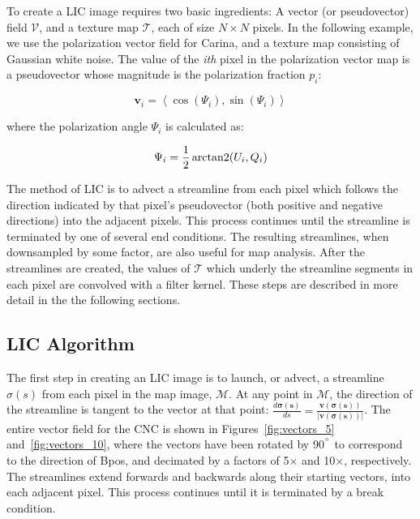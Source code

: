 To create a LIC image requires two basic ingredients: A vector (or pseudovector) field $\boldsymbol{\mathcal{V}}$, and a texture map $\mathcal{T}$, each of size $N \times N$ pixels. In the following example, we use the polarization vector field for Carina, and a texture map consisting of Gaussian white noise. The value of the \textit{ith} pixel in the polarization vector map is a pseudovector whose magnitude is the polarization fraction $p_{i}$:

\begin{equation}\label{eq:pol vector}
  \boldsymbol{v}_{i} = \left< \mathrm{\cos}(\Psi_{i}), \mathrm{\sin}(
  \Psi_{i}) \right>
\end{equation}

where the polarization angle $\Psi_{i}$ is calculated as:

\begin{equation}\label{eq:pol angle 2}
  \Psi_{i} = \frac{1}{2}\operatorname{arctan2}(U_{i}, Q_{i})
\end{equation}

The method of LIC is to advect a streamline from each pixel which follows the direction indicated by that pixel's pseudovector (both positive and negative directions) into the adjacent pixels. This process continues until the streamline is terminated by one of several end conditions. The resulting streamlines, when downsampled by some factor, are also useful for map analysis. After the streamlines are created, the values of $\mathcal{T}$ which underly the streamline segments in each pixel are convolved with a filter kernel. These steps are described in more detail in the the following sections.

\subsection{LIC Algorithm}

The first step in creating an LIC image is to launch, or advect, a streamline $\sigma(s)$ from each pixel in the map image, $\mathcal{M}$. At any point in $\mathcal{M}$, the direction of the streamline is tangent to the vector at that point: $\frac{ d\boldsymbol{\sigma(s)}}{ds} = \boldsymbol{ \frac{ v(\sigma(s)) }{\lvert v(\sigma(s)) \rvert} }$. The entire vector field for the CNC is shown in Figures~\ref{fig:vectors_5} and~\ref{fig:vectors_10}, where the vectors have been rotated by 90$^{\degree}$ to correspond to the direction of \gls{Bpos}, and decimated by a factors of 5$\times$ and 10$\times$, respectively. The streamlines extend forwards and backwards along their starting vectors, into each adjacent pixel. This process continues until it is terminated by a break condition.

